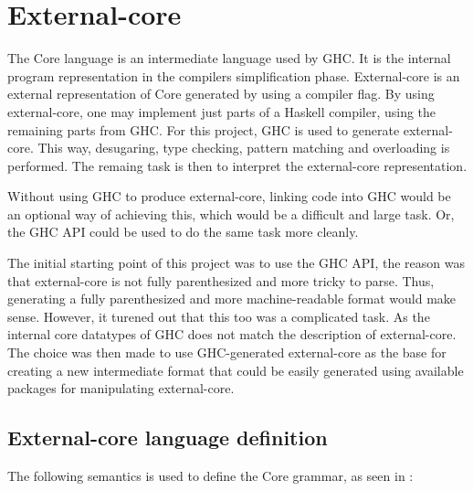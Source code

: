 
\section{External-core}



The Core language is an intermediate language used by GHC. It is the internal
program representation in the compilers simplification phase. External-core
is an external representation of Core generated by using a compiler flag. 
By using external-core, one
may implement just parts of a Haskell compiler, using the remaining parts from
GHC. For this project, GHC is used to generate external-core. This way, desugaring,
type checking, pattern matching and overloading is performed. The remaing task
is then to interpret the external-core representation. \cite{tolmach2010ghc}

Without using GHC to produce external-core, linking code into GHC would be an 
optional way of achieving this, which would be a difficult and large task.
Or, the GHC API could be used to do the same task more cleanly. \cite{tolmach2010ghc}

The initial starting point of this project was to use the GHC API, the reason
was that external-core is not fully parenthesized and more tricky to parse. Thus,
generating a fully parenthesized and more machine-readable format would make sense.
However, it turened out that this too was a complicated task. As the internal
core datatypes of GHC does not match the description of external-core. The choice was
then made to use GHC-generated external-core as the base for creating a new intermediate
format that could be easily generated using available packages for manipulating
external-core.




\clearpage

\subsection{External-core language definition}

The following semantics is used to define the Core grammar, 
as seen in \cite{tolmach2010ghc}:

